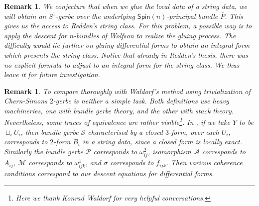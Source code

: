 \documentclass[letterpaper,10pt, oneside]{article} %
\newtheorem{rmk}[thm]{Remark}
\newcommand {\emptycomment}[1]{}
\newcommand{\Spin}{\mathsf{Spin}}%
\begin{document}
\emptycomment{
this proposition may be viewed as a refinement of the combination of the above two statements. However, the freeness of the action may not be achieved. The reason is following: if two objects are connected by an isomorphism $(1, A_i, \omega^2_i; f_{ij}, \omega_{ij}^1)$, then they must be connected by the cocycle $(f^h, A^h, B^h)$ satisfying the following equations
\[
B_i^h = \omega_i^2 + dA_i, \quad A^h_{ij}= A_j-A_i-\omega_{ij}^1 + d\log f_{ij}, \quad f^h_{ijk} = (\check{\delta} f_{..})_{ijk}.
\]
If $(f^h, A^h, B^h)=D(\varphi, \alpha)$, combining with these equations, we have
\[
(\omega^2_i, -\omega_{ij}^2, 1) = D(\alpha_i-A_i, \varphi_{ij} \cdot f_{ij}^{-1}).
\]
From the condition of 1-morphism, it is not hard to see that $D(\omega^2_i, -\omega_{ij}^1, 1)=0$. However, we still have $H^1(M, D_2)$ which surjectively maps to $H^2(M, \Z)$ as an obstruction of   $(\omega^2_i, -\omega_{ij}^1, 1)$ being exact. ***signs and comparing to the cases before.
}

\begin{rmk}\label{rmk:compare-redden}
We conjecture that when we glue the local data of a string data, we
will obtain an $S^1$-gerbe over the underlying $\Spin(n)$-principal bundle
$\bar{P}$. This gives us the access to Redden's string class. For this
problem, a possible way is to apply the descent for $n$-bundles of
Wolfson \cite[Theorem 5.7]{Wolfson} to realize the gluing process. The difficulty would
lie further on gluing differential forms to obtain an
integral form which presents the string class. Notice that already in Redden's
thesis, there was no explicit formula to adjust to an
integral form for the string class. We thus leave it for future
investigation.
\end{rmk}
\begin{rmk}\label{rmk:compare-waldorf}
To compare thoroughly with Waldorf's method using trivialization of Chern-Simons
$2$-gerbe is neither a simple task. Both definitions use heavy
machineries, one with bundle gerbe theory, and the other with stack
theory. Nevertheless, some traces of equivalence are rather
visible\footnote{Here we thank Konrad Waldorf for very
  helpful conversations.}. In \cite[Definition 2.2.1]{waldorf:string-conn}, if we
take $Y$ to be $\sqcup_{i}U_i$, then bundle gerbe $\mathcal{S}$
characterised by a closed $3$-form,  over
each $U_i$,
corresponds to $2$-form $B_i$ in a string data, since a closed form is locally
exact. Similarly the bundle gerbe $\mathcal{P}$ corresponds to
$\omega^2_{ij}$,  isomorphism $\mathcal{A}$ corresponds to $A_{ij}$,
$\mathcal{M}$ corresponds to $\omega^1_{ijk}$, and $\sigma$ corresponds to $f_{ijk}$. Then
various coherence conditions correspond to our descent equations for
differential forms.
\end{rmk}
\end{document}
